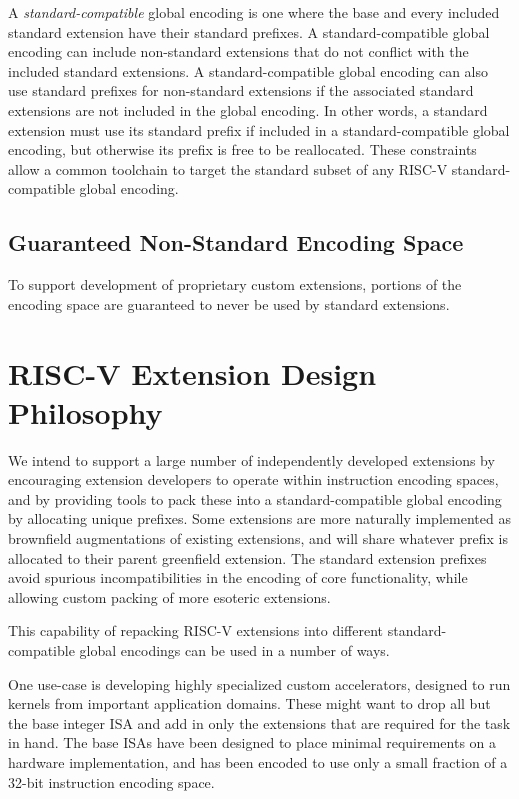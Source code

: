 A {\em standard-compatible} global encoding is one where the base and
every included standard extension have their standard prefixes.  A
standard-compatible global encoding can include non-standard
extensions that do not conflict with the included standard extensions.
A standard-compatible global encoding can also use standard prefixes
for non-standard extensions if the associated standard extensions are
not included in the global encoding.  In other words, a standard
extension must use its standard prefix if included in a
standard-compatible global encoding, but otherwise its prefix is free
to be reallocated.  These constraints allow a common toolchain to
target the standard subset of any RISC-V standard-compatible global
encoding.

\vspace{-0.2in}
\subsection*{Guaranteed Non-Standard Encoding Space}

To support development of proprietary custom extensions, portions of
the encoding space are guaranteed to never be used by standard
extensions.

\section{RISC-V Extension Design Philosophy}

We intend to support a large number of independently developed
extensions by encouraging extension developers to operate within
instruction encoding spaces, and by providing tools to pack these into
a standard-compatible global encoding by allocating unique prefixes.
Some extensions are more naturally implemented as brownfield
augmentations of existing extensions, and will share whatever prefix
is allocated to their parent greenfield extension.  The standard
extension prefixes avoid spurious incompatibilities in the encoding of
core functionality, while allowing custom packing of more esoteric
extensions.

This capability of repacking RISC-V extensions into different
standard-compatible global encodings can be used in a number of ways.

One use-case is developing highly specialized custom accelerators,
designed to run kernels from important application domains.  These
might want to drop all but the base integer ISA and add in only the
extensions that are required for the task in hand.  The base ISAs have
been designed to place minimal requirements on a hardware
implementation, and has been encoded to use only a small fraction of a
32-bit instruction encoding space.

